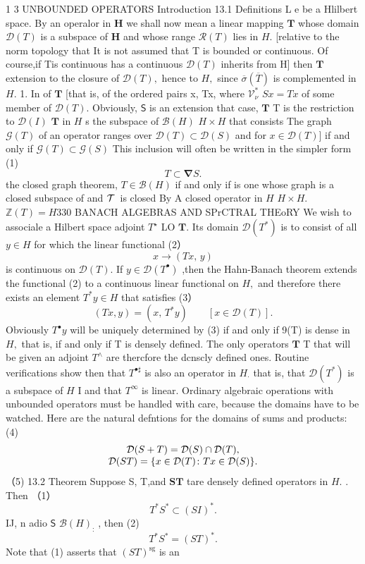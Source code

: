 1 3 UNBOUNDED OPERATORS Introduction 13.1 Definitions L $\mathrm{e}$ be a Hlilbert space. By an operalor in ${\boldsymbol{H}}$ we shall now mean a linear mapping ${\boldsymbol{T}}$ whose domain ${\mathcal{D}}(T)$ is a subspace of ${\boldsymbol{H}}$ and whose range ${\mathcal{R}}(T)$ lies in $H.$ [relative to the norm topology that It is not assumed that T is bounded or continuous. Of course,if Tis continuous has a continuous ${\mathcal{D}}(T)$ inherits from H] then ${\boldsymbol{T}}$ extension to the closure of ${\mathcal{D}}(T),$ hence to $\textstyle H,$ since ${\overline{{\sigma}}}({\overline{{T}}})$ is complemented in $H.$ 1. In of ${\boldsymbol{T}}$ [that is, of the ordered pairs {x, Tx}, where $\mathbf{\mathcal{V}}_{\nu}^{*}$ $S x=T x$ of some member of ${\mathcal{D}}(T).$ Obviously, $\boldsymbol{\mathsf{S}}$ is an extension that case, ${\boldsymbol{T}}$ T is the restriction to ${\mathcal{D}}(I)$ ${\boldsymbol{T}}$ in $H$ s the subspace of ${\mathcal{B}}(H)$ $H\times H$ that consists The graph ${\mathcal{G}}(T)$ of an operator ranges over ${\mathcal{D}}(T)\subset{\mathcal{D}}(S)$ and for $x\in{\mathcal{D}}(T)]$ if and only if $\mathcal{G}(T)\subset\mathcal{G}(S)$ This inclusion will often be written in the simpler form (1) $$ T\subset\mathbf{\nabla}S. $$ the closed graph theorem, $T\in{\mathcal{B}}(H)$ if and only if is one whose graph is a closed subspace of and ${\cal T}\,$ is closed By A closed operator in $\textstyle H$ $H\times H.$ $\mathbb{Z}(T)=H$330 BANACH ALGEBRAS AND SPrCTRAL THEoRY We wish to associale a Hilbert space adjoint $T^{\star}$ LO ${\boldsymbol{T}}.$ Its domain ${\mathcal{D}}(T^{*})$ is to consist of all $y\in H$ for which the linear functional (2） $$ x\to(T x,\,y) $$ is continuous on ${\mathcal{D}}(T).$ If $y\in{\mathcal{D}}(T^{\bullet})$ ,then the Hahn-Banach theorem extends the functional (2) to a continuous linear functional on $\textstyle H,$ and therefore there exists an element $T^{*}y\in H$ that satisfies (3） $$ (T x,y)=(x,\,T^{*}y)\qquad[x\in{\mathcal{D}}(T)]. $$ Obviously $T^{\bullet}y$ will be uniquely determined by (3) if and only if 9(T) is dense in $\textstyle H,$ that is, if and only if T is densely defined. The only operators ${\boldsymbol{T}}$ T that will be given an adjoint $T^{\mathbf{\wedge}}$ are thercfore the dcnscly defined ones. Routine verifications show then that $T^{\bullet\sharp}$ is also an operator in $\textstyle H_{\cdot}$ that is, that ${\mathcal{D}}(T^{*})$ is a subspace of $\textstyle H$ I and that $T^{\infty}$ is linear. Ordinary algebraic operations with unbounded operators must be handled with care, because the domains have to be watched. Here are the natural defntions for the domains of sums and products: (4) $$ \begin{array}{c l c r}{{{\mathcal D}(S+T)={\mathcal D}(S)\cap{\mathcal D}(T),}}\\ {{{\mathcal D}(S T)=\{x\in{\mathcal D}(T)\colon T x\in{\mathcal D}(S)\}.}}\end{array} $$ （5) 13.2 Theorem Suppose S, T,and ${\boldsymbol{S}}{\boldsymbol{T}}$ tare densely defined operators in $H.$ . Then （1） $$ T^{*}S^{*}\subset(S I)^{*}. $$ IJ, n adio $\boldsymbol{\mathsf{S}}$ ${\mathcal{B}}(H)_{:}$ , then (2) $$ T^{*}S^{*}=(S T)^{*}. $$ Note that (1) asserts that $(S T)^{\mathrm{sg}}$ is an 